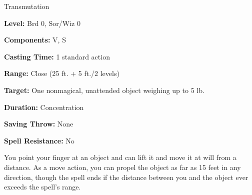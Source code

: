 
Transmutation

\textbf{Level:} Brd 0, Sor/Wiz 0

\textbf{Components:} V, S

\textbf{Casting Time:} 1 standard action

\textbf{Range:} Close (25 ft. + 5 ft./2 levels)

\textbf{Target:} One nonmagical, unattended object weighing up to 5 lb.

\textbf{Duration:} Concentration

\textbf{Saving Throw:} None

\textbf{Spell Resistance:} No

You point your finger at an object and can lift it and move it at will from a distance. 
As a move action, you can propel the object as far as 15 feet in any direction, 
though the spell ends if the distance between you and the object ever exceeds the 
spell's range.

